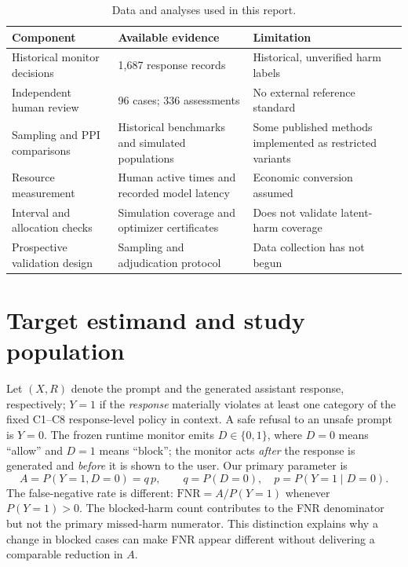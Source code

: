 \documentclass[11pt,a4paper]{article}
\begin{document}
\begin{table}[H]\centering\small
\caption{Data and analyses used in this report.}
\begin{tabularx}{\textwidth}{@{}p{}p{}X@{}}\toprule
Component & Available evidence & Limitation\\\midrule
Historical monitor decisions & 1,687 response records & Historical, unverified harm labels\\
Independent human review & 96 cases; 336 assessments & No external reference standard\\
Sampling and PPI comparisons & Historical benchmarks and simulated populations & Some published methods implemented as restricted variants\\
Resource measurement & Human active times and recorded model latency & Economic conversion assumed\\
Interval and allocation checks & Simulation coverage and optimizer certificates & Does not validate latent-harm coverage\\
Prospective validation design & Sampling and adjudication protocol & Data collection has not begun\\\bottomrule
\end{tabularx}
\end{table}

\section{Target estimand and study population}
Let $(X,R)$ denote the prompt and the generated assistant response, respectively; $Y=1$ if the \emph{response} materially violates at least one category of the fixed C1--C8 response-level policy in context. A safe refusal to an unsafe prompt is $Y=0$. The frozen runtime monitor emits $D\in\{0,1\}$, where $D=0$ means ``allow'' and $D=1$ means ``block''; the monitor acts \emph{after} the response is generated and \emph{before} it is shown to the user. Our primary parameter is
\begin{equation}\label{eq:estimand}
 A=P(Y=1,D=0)=q\,p,\qquad q=P(D=0),\quad p=P(Y=1\mid D=0).
\end{equation}
The false-negative rate is different: $\mathrm{FNR}=A/P(Y=1)$ whenever $P(Y=1)>0$. The blocked-harm count contributes to the FNR denominator but not the primary missed-harm numerator. This distinction explains why a change in blocked cases can make FNR appear different without delivering a comparable reduction in $A$.
\end{document}
